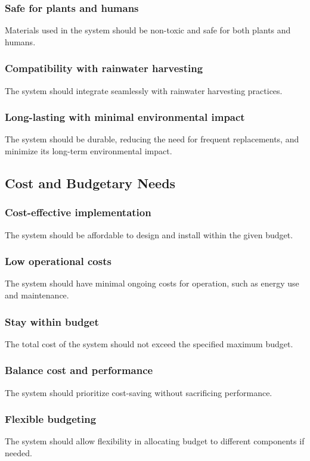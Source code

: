 \documentclass[12pt]{report}
\begin{document}
\subsubsection{Safe for plants and humans}
Materials used in the system should be non-toxic and safe for both plants and humans.

\subsubsection{Compatibility with rainwater harvesting}
The system should integrate seamlessly with rainwater harvesting practices.

\subsubsection{Long-lasting with minimal environmental impact}
The system should be durable, reducing the need for frequent replacements, and minimize its long-term environmental impact.

\newpage
\subsection{Cost and Budgetary Needs}

\subsubsection{Cost-effective implementation}
The system should be affordable to design and install within the given budget.

\subsubsection{Low operational costs}
The system should have minimal ongoing costs for operation, such as energy use and maintenance.

\subsubsection{Stay within budget}
The total cost of the system should not exceed the specified maximum budget.

\subsubsection{Balance cost and performance}
The system should prioritize cost-saving without sacrificing performance.

\subsubsection{Flexible budgeting}
The system should allow flexibility in allocating budget to different components if needed.
\end{document}
